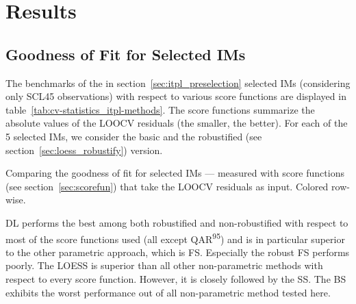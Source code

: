 \chapter{Results}\label{sec:results}

\section{Goodness of Fit for Selected {{IM}}s}{
	\label{sec:results_itpl}
	The benchmarks of the in section~\ref{sec:itpl_preselection} selected {{IM}}s (considering only SCL45 observations) with respect to various score functions are displayed in table~\ref{tab:cv-statistics_itpl-methods}. The score functions summarize the absolute values of the LOOCV residuals (the smaller, the better). For each of the 5 selected {{IM}}s, we consider the basic and the robustified (see section~\ref{sec:loess_robustify}) version.

	\begin{table}[h]
		\begin{center}
			\caption[Goodness of fit for {{IM}}s  measured with score functions.]{Comparing the goodness of fit for selected {{IM}}s --- measured with score functions (see section~\ref{sec:scorefun}) that take the LOOCV residuals as input. Colored row-wise.}
			\scriptsize
			
			\normalsize
			\label{tab:cv-statistics_itpl-methods}
		\end{center}
	\end{table}
	
	DL performs the best among both robustified and non-robustified with respect to most of the score functions used (all except QAR\textsuperscript{95}) and is in particular superior to the other parametric approach, which is FS. Especially the robust FS performs poorly. The LOESS is superior than all other non-parametric methods with respect to every score function. However, it is closely followed by the SS. The BS exhibits the worst performance out of all non-parametric method tested here. 
}


